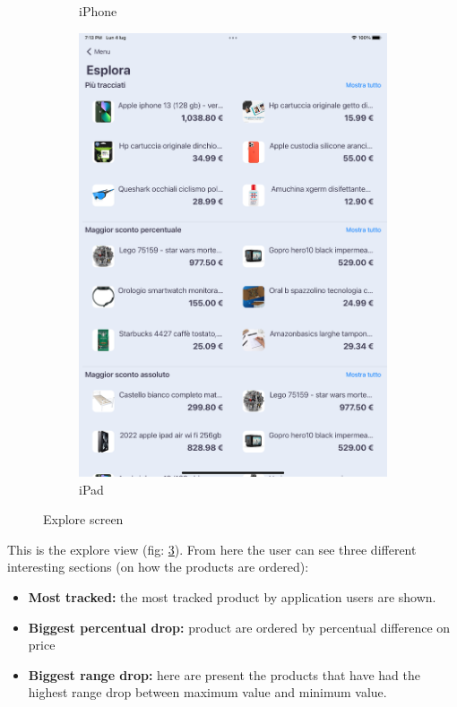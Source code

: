 \begin{figure}[h!]
\begin{subfigure}[b]{0.3\textwidth}
            \caption{iPhone}
            \label{fig:explore_screen_iphone}
        \end{subfigure}
        \begin{subfigure}[b]{0.45\textwidth}
            \centering
            \includegraphics[width=\textwidth]{images/interfaces/explore_screen_ipad.png}
            \caption{iPad}
            \label{fig:explore_screen_ipad}
        \end{subfigure}
         \caption{Explore screen}
        \label{fig:explore_screen}
\end{figure}
\FloatBarrier
This is the explore view (fig: \ref{fig:explore_screen}). From here the user can see three different interesting sections (on how the products are ordered):
\begin{itemize}
    \item \textbf{Most tracked:} the most tracked product by application users are shown.
    \item \textbf{Biggest percentual drop:} product are ordered by percentual difference on price
    \item \textbf{Biggest range drop:} here are present the products that have had the highest range drop between maximum value and minimum value.
\end{itemize}

